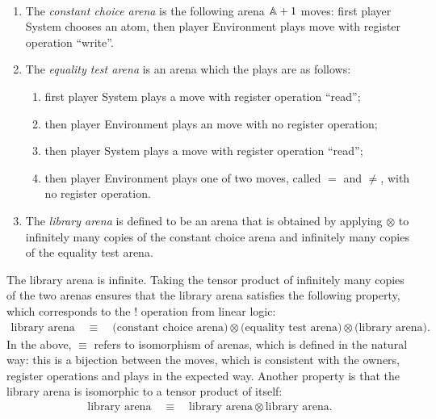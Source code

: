 \begin{definition}\ 
    \begin{enumerate}
        \item The \emph{constant choice arena} is the following arena $\mathbb A+1$ moves:
        first player System chooses an atom, then player Environment plays move with register operation ``write''.
        \item The \emph{equality test arena} is an arena which the plays are as follows:
    \begin{enumerate}
        \item first player System plays a move with register operation ``read'';
        \item then player Environment plays an move with no register operation;
        \item then player System plays a move with register operation ``read'';
        \item then player Environment plays one of two moves, called $=$ and $\neq$, with no register operation.
    \end{enumerate}
    \item The \emph{library arena} is defined to be an arena that is obtained by applying $\otimes$ to infinitely many copies of the constant choice arena and infinitely many copies of the  equality test arena.
    \end{enumerate}
\end{definition}

The library arena is infinite. Taking the tensor product of infinitely many copies of the two arenas ensures that the library arena satisfies the following property, which corresponds to the $!$ operation from linear logic: 
\begin{align}\label{eq:bang-library-arena}
\text{library arena} 
\quad \equiv \quad 
\text{(constant choice arena)} \otimes 
\text{(equality test arena)} \otimes
 \text{(library arena)}.
\end{align}
In the above, $\equiv$ refers to isomorphism of arenas, which is defined in the natural way: this is a bijection between the moves, which is consistent with the owners, register operations and plays in the expected way.  Another property is that the library arena is isomorphic to a tensor product of itself: 
\begin{align}\label{eq:library-arena-isomorphism}
\text{library arena}
\quad \equiv \quad
\text{library arena} \otimes \text{library arena}.
\end{align}


